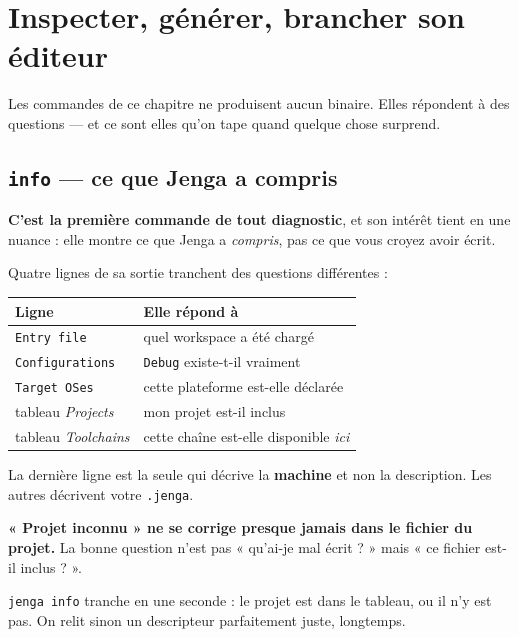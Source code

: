\chapter{Inspecter, générer, brancher son éditeur}

Les commandes de ce chapitre ne produisent aucun binaire. Elles répondent à des
questions --- et ce sont elles qu'on tape quand quelque chose surprend.

\section{\texttt{info} --- ce que Jenga a compris}

\begin{nkretenir}
\textbf{C'est la première commande de tout diagnostic}, et son intérêt tient en
une nuance : elle montre ce que Jenga a \emph{compris}, pas ce que vous croyez
avoir écrit.

Quatre lignes de sa sortie tranchent des questions différentes :

\begin{center}
\begin{tabular}{@{}ll@{}}
\toprule
\textbf{Ligne} & \textbf{Elle répond à} \\
\midrule
\texttt{Entry file} & quel workspace a été chargé \\
\texttt{Configurations} & \texttt{Debug} existe-t-il vraiment \\
\texttt{Target OSes} & cette plateforme est-elle déclarée \\
tableau \emph{Projects} & mon projet est-il inclus \\
tableau \emph{Toolchains} & cette chaîne est-elle disponible \emph{ici} \\
\bottomrule
\end{tabular}
\end{center}

La dernière ligne est la seule qui décrive la \textbf{machine} et non la
description. Les autres décrivent votre \texttt{.jenga}.
\end{nkretenir}

\begin{nkpiege}
\textbf{« Projet inconnu » ne se corrige presque jamais dans le fichier du
projet.} La bonne question n'est pas « qu'ai-je mal écrit ? » mais « ce fichier
est-il inclus ? ».

\texttt{jenga info} tranche en une seconde : le projet est dans le tableau, ou il
n'y est pas. On relit sinon un descripteur parfaitement juste, longtemps.
\end{nkpiege}

